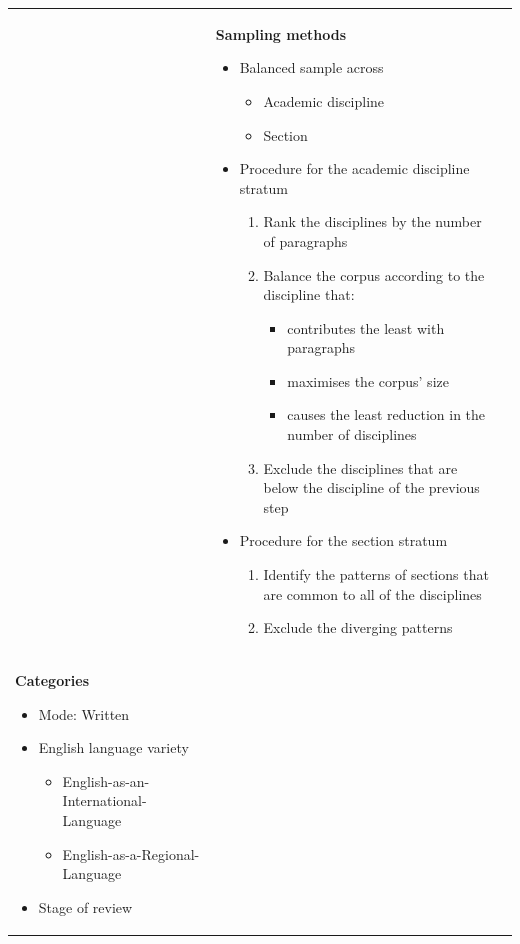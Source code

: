 \begin{longtable}[c]{ |p{8cm}|p{8cm}|p{8cm}| }
     &
    \textbf{Sampling methods}
    \begin{itemize}
        \item Balanced sample across
        \begin{itemize}
            \item Academic discipline
            \item Section
        \end{itemize}
        \item Procedure for the academic discipline stratum
        \begin{enumerate}
            \item Rank the disciplines by the number of paragraphs
            \item Balance the corpus according to the discipline that:
            \begin{itemize}
                \item contributes the least with paragraphs
                \item maximises the corpus' size
                \item causes the least reduction in the number of disciplines
            \end{itemize}
            \item Exclude the disciplines that are below the discipline of the previous step
        \end{enumerate}
        \item Procedure for the section stratum
        \begin{enumerate}
            \item Identify the patterns of sections that are common to all of the disciplines
            \item Exclude the diverging patterns
        \end{enumerate}
    \end{itemize}
     \\
    \textbf{Categories}
    \begin{itemize}
        \item Mode: Written
        \item English language variety
        \begin{itemize}
            \item English-as-an-International-Language
            \item English-as-a-Regional-Language
        \end{itemize}
        \item Stage of review

\end{itemize}
\end{longtable}
